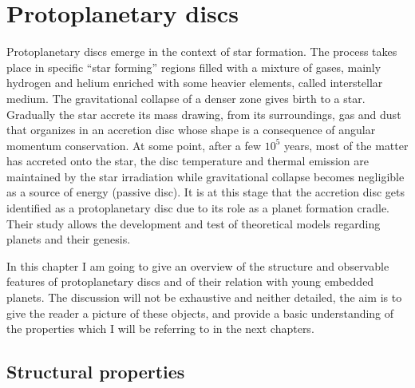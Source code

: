 \documentclass[a4paper,10pt]{report}
\begin{document}
\chapter{Protoplanetary discs}

Protoplanetary discs emerge in the context of star formation. 
The process takes place in specific ``star forming'' regions filled with a mixture of gases, mainly hydrogen and helium enriched with some
heavier elements, called interstellar medium. The gravitational collapse of a denser zone gives birth to a star. Gradually the star
accrete its mass drawing, from its surroundings, gas and dust that organizes in an accretion disc whose shape is a consequence of angular momentum conservation.
At some point, after a few $10^5$ years, most of the matter has accreted onto the star,
the disc temperature and thermal emission are maintained by the star irradiation while gravitational collapse becomes negligible as a source of energy (passive disc). 
It is at this stage that the accretion disc gets identified
as a protoplanetary disc due to its role as a planet formation cradle.
Their study allows the development and test of theoretical models regarding planets and their genesis.

In this chapter I am going to give an overview of the structure and observable features
of protoplanetary discs and of their relation with young embedded planets. The discussion will not be
exhaustive and neither detailed, the aim is to give
the reader a picture of these objects, and provide a basic understanding of the 
properties which I will be referring to in the next chapters.

\section{Structural properties}
\end{document}
